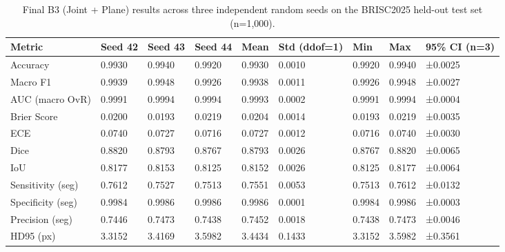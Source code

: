 \begin{table}
\caption{Final B3 (Joint + Plane) results across three independent random seeds on the BRISC2025 held-out test set (n=1,000).}
\label{tab:final_results}
\begin{tabular}{lllllllll}
\toprule
Metric & Seed 42 & Seed 43 & Seed 44 & Mean & Std (ddof=1) & Min & Max & 95\% CI (n=3) \\
\midrule
Accuracy & 0.9930 & 0.9940 & 0.9920 & 0.9930 & 0.0010 & 0.9920 & 0.9940 & ±0.0025 \\
Macro F1 & 0.9939 & 0.9948 & 0.9926 & 0.9938 & 0.0011 & 0.9926 & 0.9948 & ±0.0027 \\
AUC (macro OvR) & 0.9991 & 0.9994 & 0.9994 & 0.9993 & 0.0002 & 0.9991 & 0.9994 & ±0.0004 \\
Brier Score & 0.0200 & 0.0193 & 0.0219 & 0.0204 & 0.0014 & 0.0193 & 0.0219 & ±0.0035 \\
ECE & 0.0740 & 0.0727 & 0.0716 & 0.0727 & 0.0012 & 0.0716 & 0.0740 & ±0.0030 \\
Dice & 0.8820 & 0.8793 & 0.8767 & 0.8793 & 0.0026 & 0.8767 & 0.8820 & ±0.0065 \\
IoU & 0.8177 & 0.8153 & 0.8125 & 0.8152 & 0.0026 & 0.8125 & 0.8177 & ±0.0064 \\
Sensitivity (seg) & 0.7612 & 0.7527 & 0.7513 & 0.7551 & 0.0053 & 0.7513 & 0.7612 & ±0.0132 \\
Specificity (seg) & 0.9984 & 0.9986 & 0.9986 & 0.9986 & 0.0001 & 0.9984 & 0.9986 & ±0.0003 \\
Precision (seg) & 0.7446 & 0.7473 & 0.7438 & 0.7452 & 0.0018 & 0.7438 & 0.7473 & ±0.0046 \\
HD95 (px) & 3.3152 & 3.4169 & 3.5982 & 3.4434 & 0.1433 & 3.3152 & 3.5982 & ±0.3561 \\
\bottomrule
\end{tabular}
\end{table}
